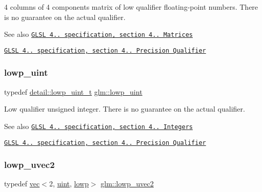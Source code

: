 4 columns of 4 components matrix of low qualifier floating-\/point numbers. There is no guarantee on the actual qualifier.

\begin{DoxySeeAlso}{See also}
\href{http://www.opengl.org/registry/doc/GLSLangSpec.4.20.8.pdf}{\tt G\+L\+SL 4.. specification, section 4.. Matrices} 

\href{http://www.opengl.org/registry/doc/GLSLangSpec.4.20.8.pdf}{\tt G\+L\+SL 4.. specification, section 4.. Precision Qualifier} 
\end{DoxySeeAlso}
\mbox{\label{group__core__precision_ga8077c90f2c87e419ea6c273157dcc1fc}} 
\subsubsection{\texorpdfstring{lowp\+\_\+uint}{lowp\_uint}}
{\footnotesize\ttfamily typedef \hyperlink{namespaceglm_1_1detail_ad59c4581ad8ce0c3ef6146edaa7e15dc}{detail\+::lowp\+\_\+uint\+\_\+t} \hyperlink{group__core__precision_ga8077c90f2c87e419ea6c273157dcc1fc}{glm\+::lowp\+\_\+uint}}

Low qualifier unsigned integer. There is no guarantee on the actual qualifier.

\begin{DoxySeeAlso}{See also}
\href{http://www.opengl.org/registry/doc/GLSLangSpec.4.20.8.pdf}{\tt G\+L\+SL 4.. specification, section 4.. Integers} 

\href{http://www.opengl.org/registry/doc/GLSLangSpec.4.20.8.pdf}{\tt G\+L\+SL 4.. specification, section 4.. Precision Qualifier} 
\end{DoxySeeAlso}
\mbox{\label{group__core__precision_gaf2f2771efb431071890586c01401ebd8}} 
\subsubsection{\texorpdfstring{lowp\+\_\+uvec2}{lowp\_uvec2}}
{\footnotesize\ttfamily typedef \hyperlink{structglm_1_1vec}{vec}$<$2, \hyperlink{group__core__precision_ga4fd29415871152bfb5abd588334147c8}{uint}, \hyperlink{namespaceglm_a36ed105b07c7746804d7fdc7cc90ff25ae161af3fc695e696ce3bf69f7332bc2d}{lowp}$>$ \hyperlink{group__core__precision_gaf2f2771efb431071890586c01401ebd8}{glm\+::lowp\+\_\+uvec2}}

